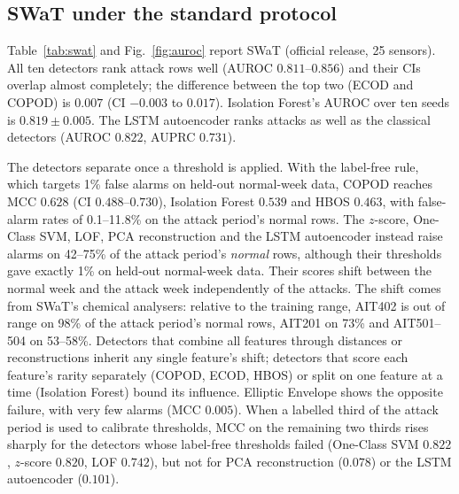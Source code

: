 \documentclass[11pt]{article}
\begin{document}
\subsection{SWaT under the standard protocol}
Table~\ref{tab:swat} and Fig.~\ref{fig:auroc} report SWaT (official release, 25
sensors). All ten detectors rank attack rows well (AUROC $0.811$--$0.856$) and their
CIs overlap almost completely; the difference between the top two (ECOD and COPOD) is
$0.007$ (CI $-0.003$ to $0.017$). Isolation Forest's AUROC over ten seeds is
$0.819\pm0.005$. The LSTM autoencoder ranks attacks as well as the classical detectors
(AUROC $0.822$, AUPRC $0.731$).

The detectors separate once a threshold is applied. With the label-free rule, which
targets 1\% false alarms on held-out normal-week data, COPOD reaches MCC $0.628$ (CI
$0.488$--$0.730$), Isolation Forest $0.539$ and HBOS $0.463$, with false-alarm rates of
0.1--11.8\% on the attack period's normal rows. The $z$-score, One-Class SVM, LOF, PCA
reconstruction and the LSTM autoencoder instead raise alarms on 42--75\% of the attack
period's \emph{normal} rows, although their thresholds gave exactly 1\% on held-out
normal-week data. Their scores shift between the normal week and the attack week
independently of the attacks. The shift comes from SWaT's chemical analysers: relative
to the training range, AIT402 is out of range on 98\% of the attack period's normal
rows, AIT201 on 73\% and AIT501--504 on 53--58\%. Detectors that combine all features
through distances or reconstructions inherit any single feature's shift; detectors that
score each feature's rarity separately (COPOD, ECOD, HBOS) or split on one feature at a
time (Isolation Forest) bound its influence. Elliptic Envelope shows the opposite failure,
with very few alarms (MCC $0.005$). When a labelled third of the attack period is used to
calibrate thresholds, MCC on the remaining two thirds rises sharply for the detectors
whose label-free thresholds failed (One-Class SVM $0.822$, $z$-score $0.820$, LOF
$0.742$), but not for PCA reconstruction ($0.078$) or the LSTM autoencoder ($0.101$).
\end{document}
